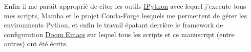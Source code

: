 \documentclass[index]{subfiles}
\begin{document}
Enfin il me parait approprié de citer les outils \href{\github{ipython/ipython}}{IPython} avec lequel j'execute tous mes scripts, \href{\github{mamba-org/mamba}}{Mamba} et le projet \href{https://conda-forge.org}{Conda-Forge} lesquels me permettent de gérer les environments Python, et enfin le travail épatant derrière le framework de configuration \href{\github{doomemacs/doomemacs}}{Doom Emacs} sur lequel tous les scripts et ce manuscript (entre autres) ont été écrits.

 {}
\end{document}

